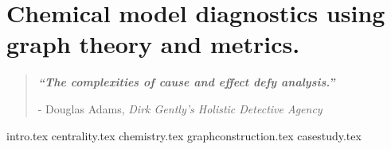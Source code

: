 

\chapter{ Chemical model diagnostics using graph theory and metrics.  }


\blankpage
\restoregeometry
\vspace*{0.15\paperheight}


\begin{center}
\begin{quotation}
  \large{\emph{\textbf{``The complexities of cause and effect defy analysis.''} }  }  \\
  \begin{flushright}
  - Douglas Adams, \textit{Dirk Gently's Holistic Detective Agency}
  \end{flushright}
 \end{quotation}
\end{center}
\doublespacing
\newpage

    
{intro.tex}
{centrality.tex}
{chemistry.tex}
{graphconstruction.tex}
{casestudy.tex}

\chapterbib






